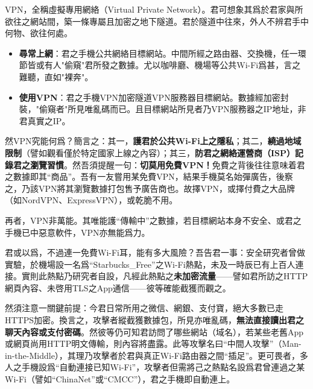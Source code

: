 


VPN，全稱虛擬專用網絡（Virtual Private Network）。君可想象其爲於君家與所欲往之網站間，築一條專屬且加密之地下隧道。君於隧道中往來，外人不辨君手中何物、欲往何處。

\begin{itemize}
  \item \textbf{尋常上網}：君之手機公共網絡目標網站。中間所經之路由器、交換機，任一環節皆或有人"偷窺"君所發之數據。尤以咖啡廳、機場等公共Wi-Fi爲甚，言之難聽，直如"裸奔"。
  \item \textbf{使用VPN}：君之手機VPN加密隧道VPN服務器目標網站。數據經加密封裝，"偷窺者"所見唯亂碼而已。且目標網站所見者乃VPN服務器之IP地址，非君真實之IP。
\end{itemize}

然VPN究能何爲？簡言之：其一，\textbf{護君於公共Wi-Fi上之隱私}；其二，\textbf{繞過地域限制}（譬如觀看僅於特定國家上線之內容）；其三，\textbf{防君之網絡運營商（ISP）記錄君之瀏覽習慣}。然吾須提醒一句：\textbf{切莫用免費VPN！}免費之背後往往意味着君之數據即其“商品”。吾有一友嘗用某免費VPN，結果手機莫名始彈廣告，後察之，乃該VPN將其瀏覽數據打包售予廣告商也。故擇VPN，或擇付費之大品牌（如NordVPN、ExpressVPN），或乾脆不用。

再者，VPN非萬能。其唯能護“傳輸中”之數據，若目標網站本身不安全、或君之手機已中惡意軟件，VPN亦無能爲力。


君或以爲，不過連一免費Wi-Fi耳，能有多大風險？吾告君一事：安全研究者曾做實驗，於機場設一名爲“Starbucks\_Free”之Wi-Fi熱點，未及一時辰已有上百人連接。實則此熱點乃研究者自設，凡經此熱點之\textbf{未加密流量}——譬如君所訪之HTTP網頁內容、未啓用TLS之App通信——彼等確能截獲而觀之。

然須注意一關鍵前提：今君日常所用之微信、網銀、支付寶，絕大多數已走HTTPS加密。換言之，攻擊者縱截獲數據包，所見亦唯亂碼，\textbf{無法直接讀出君之聊天內容或支付密碼}。然彼等仍可知君訪問了哪些網站（域名），若某些老舊App或網頁尚用HTTP明文傳輸，則內容將盡露。此等攻擊名曰“中間人攻擊”（Man-in-the-Middle），其理乃攻擊者於君與真正Wi-Fi路由器之間“插足”。更可畏者，多人之手機設爲“自動連接已知Wi-Fi”，攻擊者但需將己之熱點名設爲君曾連過之某Wi-Fi（譬如“ChinaNet”或“CMCC”），君之手機即自動連上。

